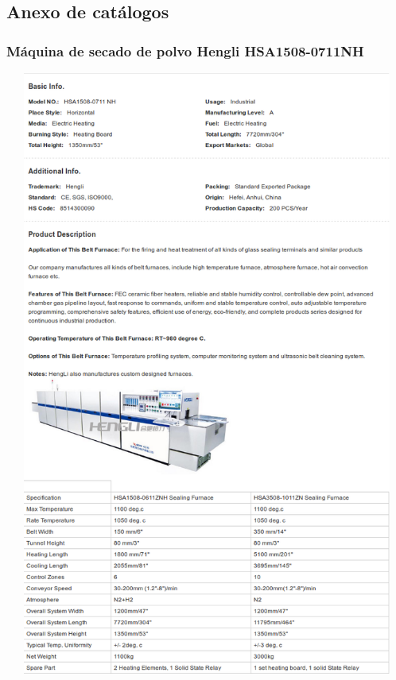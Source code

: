 \subsection{Anexo de catálogos}

\pagebreak

\subsubsection{Máquina de secado de polvo Hengli HSA1508-0711NH }
\includegraphics[width=15cm,height=20cm,keepaspectratio]{Datasheets/1Horno.png} 
\newpage

